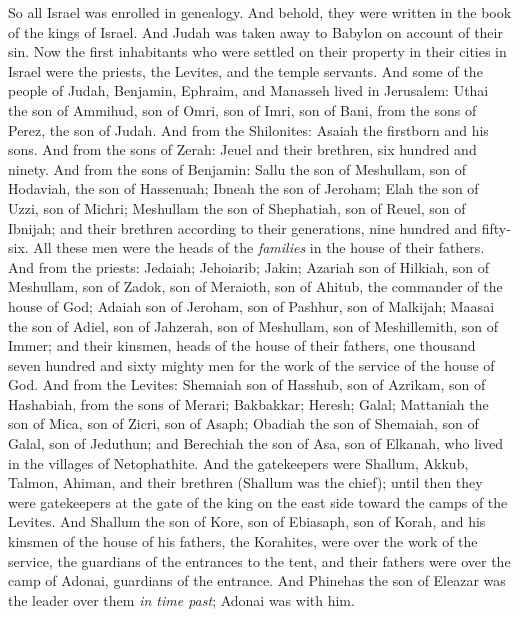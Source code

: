 \begin{biblechapter} %
 So all Israel was enrolled in genealogy. And behold, they were written in the book of the kings of Israel. And Judah was taken away to Babylon on account of their sin.
\verse Now the first inhabitants who were settled on their property in their cities in Israel were the priests, the Levites, and the temple servants.
\verse And some of the people of Judah, Benjamin, Ephraim, and Manasseh lived in Jerusalem:
\verse Uthai the son of Ammihud, son of Omri, son of Imri, son of Bani, from the sons of Perez, the son of Judah.
\verse And from the Shilonites: Asaiah the firstborn and his sons.
\verse And from the sons of Zerah: Jeuel and their brethren, six hundred and ninety.
\verse And from the sons of Benjamin: Sallu the son of Meshullam, son of Hodaviah, the son of Hassenuah;
\verse Ibneah the son of Jeroham; Elah the son of Uzzi, son of Michri; Meshullam the son of Shephatiah, son of Reuel, son of Ibnijah;
\verse and their brethren according to their generations, nine hundred and fifty-six. All these men were the heads of the \textit{families} in the house of their fathers.
\verse And from the priests: Jedaiah; Jehoiarib; Jakin;
\verse Azariah son of Hilkiah, son of Meshullam, son of Zadok, son of Meraioth, son of Ahitub, the commander of the house of God;
\verse Adaiah son of Jeroham, son of Pashhur, son of Malkijah; Maasai the son of Adiel, son of Jahzerah, son of Meshullam, son of Meshillemith, son of Immer;
\verse and their kinsmen, heads of the house of their fathers, one thousand seven hundred and sixty mighty men for the work of the service of the house of God.
\verse And from the Levites: Shemaiah son of Hasshub, son of Azrikam, son of Hashabiah, from the sons of Merari;
\verse Bakbakkar; Heresh; Galal; Mattaniah the son of Mica, son of Zicri, son of Asaph;
\verse Obadiah the son of Shemaiah, son of Galal, son of Jeduthun; and Berechiah the son of Asa, son of Elkanah, who lived in the villages of Netophathite.
\verse And the gatekeepers were Shallum, Akkub, Talmon, Ahiman, and their brethren (Shallum was the chief);
\verse until then they were gatekeepers at the gate of the king on the east side toward the camps of the Levites.
\verse And Shallum the son of Kore, son of Ebiasaph, son of Korah, and his kinsmen of the house of his fathers, the Korahites, were over the work of the service, the guardians of the entrances to the tent, and their fathers were over the camp of Adonai, guardians of the entrance.
\verse And Phinehas the son of Eleazar was the leader over them \textit{in time past}; Adonai was with him.

\end{biblechapter}
